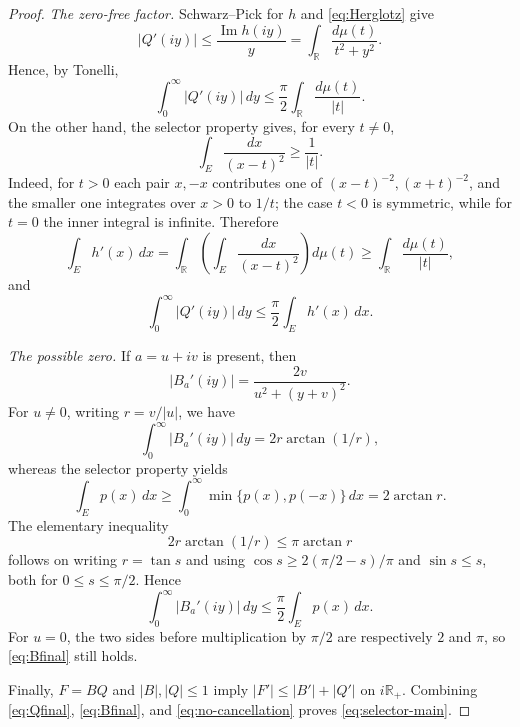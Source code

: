 \documentclass[11pt]{article}
\theoremstyle{remark}
\newcommand{\R}{\mathbb R}
\begin{document}
\begin{proof}
\smallskip
\noindent\emph{The zero-free factor.}
Schwarz--Pick for $h$ and \eqref{eq:Herglotz} give
\[
  |Q'(iy)|
  \le\frac{\operatorname{Im}h(iy)}{y}
  =\int_{\R}\frac{d\mu(t)}{t^2+y^2}.
\]
Hence, by Tonelli,
\begin{equation}\label{eq:Qvertical}
  \int_0^\infty|Q'(iy)|\,dy
  \le\frac\pi2\int_{\R}\frac{d\mu(t)}{|t|}.
\end{equation}
On the other hand, the selector property gives, for every $t\ne0$,
\begin{equation}\label{eq:kernel}
  \int_E\frac{dx}{(x-t)^2}\ge\frac1{|t|}.
\end{equation}
Indeed, for $t>0$ each pair $x,-x$ contributes one of
$(x-t)^{-2},(x+t)^{-2}$, and the smaller one integrates over $x>0$ to $1/t$;
the case $t<0$ is symmetric, while for $t=0$ the inner integral is infinite.
Therefore
\begin{equation}\label{eq:Qestimate}
  \int_Eh'(x)\,dx
  =\int_{\R}\left(\int_E\frac{dx}{(x-t)^2}\right)d\mu(t)
  \ge\int_{\R}\frac{d\mu(t)}{|t|},
\end{equation}
and
\begin{equation}\label{eq:Qfinal}
  \int_0^\infty|Q'(iy)|\,dy
  \le\frac\pi2\int_Eh'(x)\,dx.
\end{equation}

\smallskip
\noindent\emph{The possible zero.}
If $a=u+iv$ is present, then
\[
  |B_a'(iy)|=\frac{2v}{u^2+(y+v)^2}.
\]
For $u\ne0$, writing $r=v/|u|$, we have
\begin{equation}\label{eq:Bvertical}
  \int_0^\infty|B_a'(iy)|\,dy=2r\arctan(1/r),
\end{equation}
whereas the selector property yields
\begin{equation}\label{eq:Bboundary}
  \int_Ep(x)\,dx
  \ge\int_0^\infty\min\{p(x),p(-x)\}\,dx
  =2\arctan r.
\end{equation}
The elementary inequality
\[
  2r\arctan(1/r)\le\pi\arctan r
\]
follows on writing $r=\tan s$ and using
$\cos s\ge2(\pi/2-s)/\pi$ and $\sin s\le s$, both for
$0\leq s \leq \pi/2$. Hence
\begin{equation}\label{eq:Bfinal}
  \int_0^\infty|B_a'(iy)|\,dy
  \le\frac\pi2\int_Ep(x)\,dx.
\end{equation}
For $u=0$, the two sides before multiplication by $\pi/2$ are respectively
$2$ and $\pi$, so \eqref{eq:Bfinal} still holds.

Finally, $F=BQ$ and $|B|,|Q|\le1$ imply $|F'|\le|B'|+|Q'|$ on $i\R_+$.
Combining \eqref{eq:Qfinal}, \eqref{eq:Bfinal}, and
\eqref{eq:no-cancellation} proves \eqref{eq:selector-main}.
\end{proof}
\end{document}
